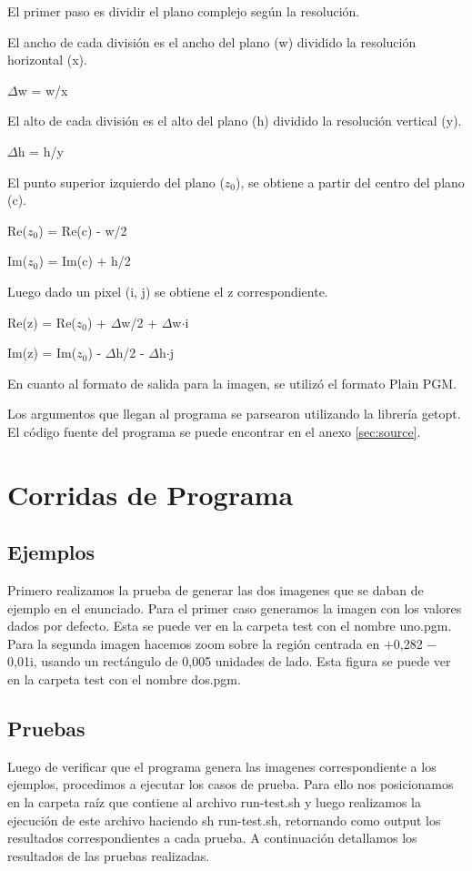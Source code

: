 \documentclass{article}
\begin{document}
El primer paso es dividir el plano complejo según la resolución. 

El ancho de cada división es el ancho del plano (w) dividido la resolución horizontal (x).

$\Delta$w = w/x

El alto de cada división es el alto del plano (h) dividido la resolución vertical (y).

$\Delta$h = h/y

El punto superior izquierdo del plano ($z_{0}$), se obtiene a partir del centro del plano (c).

Re($z_{0}$) = Re(c) - w/2

Im($z_{0}$) = Im(c) + h/2

Luego dado un pixel (i, j) se obtiene el z correspondiente.

Re(z) = Re($z_{0}$) + $\Delta$w/2 + $\Delta$w$\cdot$i

Im(z) = Im($z_{0}$) - $\Delta$h/2 - $\Delta$h$\cdot$j

En cuanto al formato de salida para la imagen, se utilizó el formato Plain PGM.

Los argumentos que llegan al programa se parsearon utilizando la librería getopt. 
El código fuente del programa se puede encontrar en el anexo \ref{sec:source}.

\section{Corridas de Programa}

\subsection{Ejemplos}

Primero realizamos la prueba de generar las dos imagenes que se daban de ejemplo en el enunciado. Para el primer caso generamos la imagen con los valores dados por defecto. Esta se puede ver en la carpeta test con el nombre uno.pgm.
Para la segunda imagen hacemos zoom sobre la región centrada en +0,282 − 0,01i, usando un rectángulo de 0,005 unidades de lado. Esta figura se puede ver en la carpeta test con el nombre dos.pgm.

\subsection{Pruebas}

Luego de verificar que el programa genera las imagenes correspondiente a los ejemplos, procedimos a ejecutar los casos de prueba. Para ello nos posicionamos en la carpeta raíz que contiene al archivo run-test.sh y luego realizamos la ejecución de este archivo  haciendo sh run-test.sh, retornando como output los resultados correspondientes a cada prueba.
A continuación detallamos los resultados de las pruebas realizadas.
\end{document}
